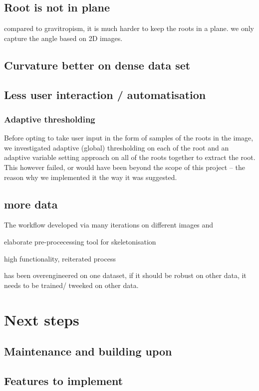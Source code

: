 \subsection{Root is not in plane}

compared to gravitropism, it is much harder to keep the roots in a plane. we only capture the angle based on 2D images.

\subsection{Curvature better on dense data set}



\subsection{Less user interaction / automatisation}

\subsubsection{Adaptive thresholding}
Before opting to take user input in the form of samples of the roots in the image, we investigated adaptive (global) thresholding on each of the root and an adaptive variable setting approach on all of the roots together to extract the root. This however failed, or would have been beyond the scope of this project -- the reason why we implemented it the way it was suggested.



\subsection{more data}


The workflow developed via  many iterations on different images and 

elaborate pre-procecessing tool for skeletonisation

high functionality, reiterated process

has been overengineered on one dataset, if it should be robust on other data, it needs to be trained/ tweeked on other data.




\section{Next steps}

\subsection{Maintenance and building upon}

\subsection{Features to implement}


